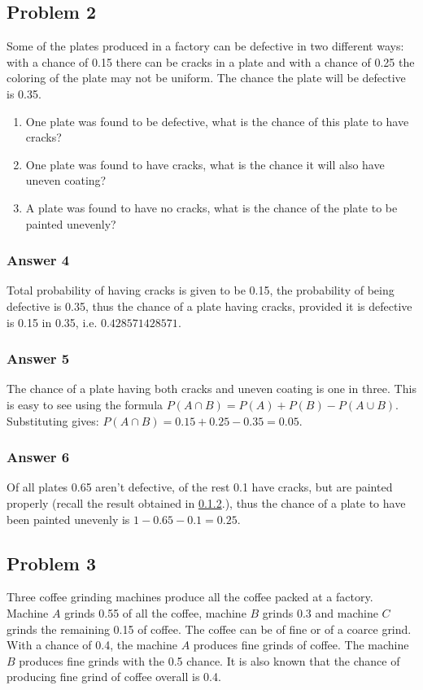 \documentclass[11pt]{article}
\begin{document}
\subsection{Problem 2}
\label{sec-1-2}
Some of the plates produced in a factory can be defective in two different
ways: with a chance of 0.15 there can be cracks in a plate and with a chance
of 0.25 the coloring of the plate may not be uniform.  The chance the
plate will be defective is 0.35.

\begin{enumerate}
\item One plate was found to be defective, what is the chance of this plate
to have cracks?
\item One plate was found to have cracks, what is the chance it will also
have uneven coating?
\item A plate was found to have no cracks, what is the chance of the plate
to be painted unevenly?
\end{enumerate}

\subsubsection{Answer 4}
\label{sec-1-2-1}
Total probability of having cracks is given to be 0.15, the probability of
being defective is 0.35, thus the chance of a plate having cracks, provided
it is defective is 0.15 in 0.35, i.e. $\num{0.428571428571}$.
\subsubsection{Answer 5}
\label{sec-1-2-2}
The chance of a plate having both cracks and uneven coating is one in three.
This is easy to see using the formula $P(A \cap B) = P(A) + P(B) - P(A \cup B)$.
Substituting gives: $P(A \cap B) = 0.15 + 0.25 - 0.35 = 0.05$.
\subsubsection{Answer 6}
\label{sec-1-2-3}
Of all plates 0.65 aren't defective, of the rest 0.1 have cracks, but are
painted properly (recall the result obtained in \ref{sec-1-2-2}.), thus the chance
of a plate to have been painted unevenly is $1 - 0.65 - 0.1 = 0.25$.
\subsection{Problem 3}
\label{sec-1-3}
Three coffee grinding machines produce all the coffee packed at a factory.
Machine $A$ grinds 0.55 of all the coffee, machine $B$ grinds 0.3 and machine
$C$ grinds the remaining 0.15 of coffee.  The coffee can be of fine or of a
coarce grind.  With a chance of 0.4, the machine $A$ produces fine grinds of
coffee.  The machine $B$ produces fine grinds with the 0.5 chance.
It is also known that the chance of producing fine grind of coffee overall
is 0.4.
\end{document}
